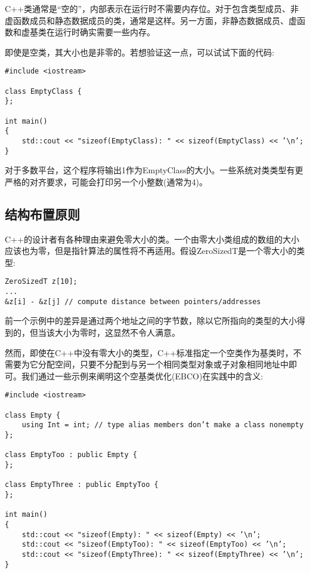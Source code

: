 
C++类通常是“空的”，内部表示在运行时不需要内存位。对于包含类型成员、非虚函数成员和静态数据成员的类，通常是这样。另一方面，非静态数据成员、虚函数和虚基类在运行时确实需要一些内存。

即使是空类，其大小也是非零的。若想验证这一点，可以试试下面的代码:

\begin{lstlisting}[style=styleCXX]
#include <iostream>

class EmptyClass {
};

int main()
{
	std::cout << "sizeof(EmptyClass): " << sizeof(EmptyClass) << ’\n’;
}
\end{lstlisting}

对于多数平台，这个程序将输出1作为EmptyClass的大小。一些系统对类类型有更严格的对齐要求，可能会打印另一个小整数(通常为4)。

\subsection{结构布置原则}

C++的设计者有各种理由来避免零大小的类。一个由零大小类组成的数组的大小应该也为零，但是指针算法的属性将不再适用。假设ZeroSizedT是一个零大小的类型:

\begin{lstlisting}[style=styleCXX]
ZeroSizedT z[10];
...
&z[i] - &z[j] // compute distance between pointers/addresses
\end{lstlisting}

前一个示例中的差异是通过两个地址之间的字节数，除以它所指向的类型的大小得到的，但当该大小为零时，这显然不令人满意。

然而，即使在C++中没有零大小的类型，C++标准指定一个空类作为基类时，不需要为它分配空间，只要不分配到与另一个相同类型对象或子对象相同地址中即可。我们通过一些示例来阐明这个空基类优化(EBCO)在实践中的含义:

\begin{lstlisting}[style=styleCXX]
#include <iostream>

class Empty {
	using Int = int; // type alias members don’t make a class nonempty
};

class EmptyToo : public Empty {
};

class EmptyThree : public EmptyToo {
};

int main()
{
	std::cout << "sizeof(Empty): " << sizeof(Empty) << ’\n’;
	std::cout << "sizeof(EmptyToo): " << sizeof(EmptyToo) << ’\n’;
	std::cout << "sizeof(EmptyThree): " << sizeof(EmptyThree) << ’\n’;
}
\end{lstlisting}

